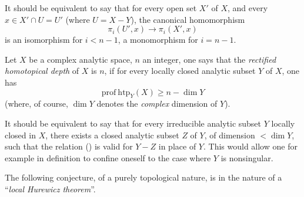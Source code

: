 It should be equivalent to say that for every open set $X'$ of $X$, and every $x\in X'\cap U=U'$ (where $U=X-Y$), the canonical homomorphism
$$
\pi_i(U', x)\to\pi_i(X', x)$$
is an isomorphism for $i<n-1$, a monomorphism for $i=n-1$.

\begin{supdefinition} \label{XIII.6.2}
Let $X$ be a complex analytic space, $n$ an integer, one says that the \emph{rectified homotopical depth} of $X$ is $n$, if for every locally closed analytic subset $Y$ of $X$, one has
\begin{equation*} \label{eq:XIII.6.x} \tag{$x$} {\mathrm{prof\:htp}_Y(X)\geq n-\dim Y}
\end{equation*}
(where, of course, $\dim Y$ denotes the \emph{complex} dimension of $Y$).
\end{supdefinition}

It should be equivalent to say that for every irreducible analytic subset $Y$ locally closed in $X$, there exists a closed analytic subset $Z$ of $Y$, of dimension $<\dim Y$, such that the relation () is valid for $Y-Z$ in place of $Y$. This would allow one for example in definition  to confine oneself to the case where $Y$ is nonsingular.

%
The following conjecture, of a purely topological nature, is in the nature of a ``\emph{local Hurewicz theorem}''.

